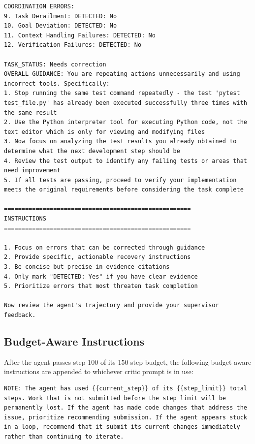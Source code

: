 \begin{lstlisting}[basicstyle=\ttfamily\scriptsize,xleftmargin=-4pt,xrightmargin=-4pt]
COORDINATION ERRORS:
9. Task Derailment: DETECTED: No
10. Goal Deviation: DETECTED: No
11. Context Handling Failures: DETECTED: No
12. Verification Failures: DETECTED: No

TASK_STATUS: Needs correction
OVERALL_GUIDANCE: You are repeating actions unnecessarily and using incorrect tools. Specifically:
1. Stop running the same test command repeatedly - the test 'pytest test_file.py' has already been executed successfully three times with the same result
2. Use the Python interpreter tool for executing Python code, not the text editor which is only for viewing and modifying files
3. Now focus on analyzing the test results you already obtained to determine what the next development step should be
4. Review the test output to identify any failing tests or areas that need improvement
5. If all tests are passing, proceed to verify your implementation meets the original requirements before considering the task complete

=====================================================
INSTRUCTIONS
=====================================================

1. Focus on errors that can be corrected through guidance
2. Provide specific, actionable recovery instructions
3. Be concise but precise in evidence citations
4. Only mark "DETECTED: Yes" if you have clear evidence
5. Prioritize errors that most threaten task completion

Now review the agent's trajectory and provide your supervisor feedback.
\end{lstlisting}

\subsection{Budget-Aware Instructions}
\label{critic:app:step_aware}

After the agent passes step 100 of its 150-step budget, the following budget-aware instructions are appended to whichever critic prompt is in use:

\begin{lstlisting}[basicstyle=\ttfamily\scriptsize,xleftmargin=-4pt,xrightmargin=-4pt]
NOTE: The agent has used {{current_step}} of its {{step_limit}} total steps. Work that is not submitted before the step limit will be permanently lost. If the agent has made code changes that address the issue, prioritize recommending submission. If the agent appears stuck in a loop, recommend that it submit its current changes immediately rather than continuing to iterate.
\end{lstlisting}

